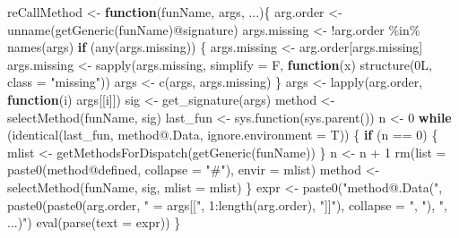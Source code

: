 \documentclass[
]{article}
\newenvironment{Shaded}{\begin{snugshade}}{\end{snugshade}}
\newcommand{\AttributeTok}[1]{\textcolor[rgb]{0.77,0.63,0.00}{#1}}
\newcommand{\ControlFlowTok}[1]{\textcolor[rgb]{0.13,0.29,0.53}{\textbf{#1}}}
\newcommand{\DecValTok}[1]{\textcolor[rgb]{0.00,0.00,0.81}{#1}}
\newcommand{\FunctionTok}[1]{\textcolor[rgb]{0.00,0.00,0.00}{#1}}
\newcommand{\NormalTok}[1]{#1}
\newcommand{\OtherTok}[1]{\textcolor[rgb]{0.56,0.35,0.01}{#1}}
\newcommand{\SpecialCharTok}[1]{\textcolor[rgb]{0.00,0.00,0.00}{#1}}
\newcommand{\StringTok}[1]{\textcolor[rgb]{0.31,0.60,0.02}{#1}}
\begin{document}
\begin{Shaded}
\begin{Highlighting}[]
\NormalTok{reCallMethod }\OtherTok{\textless{}{-}} 
  \ControlFlowTok{function}\NormalTok{(funName, args, ...)\{}
\NormalTok{    arg.order }\OtherTok{\textless{}{-}} \FunctionTok{unname}\NormalTok{(}\FunctionTok{getGeneric}\NormalTok{(funName)}\SpecialCharTok{@}\NormalTok{signature)}
\NormalTok{    args.missing }\OtherTok{\textless{}{-}} \SpecialCharTok{!}\NormalTok{arg.order }\SpecialCharTok{\%in\%} \FunctionTok{names}\NormalTok{(args)}
    \ControlFlowTok{if}\NormalTok{ (}\FunctionTok{any}\NormalTok{(args.missing)) \{}
\NormalTok{      args.missing }\OtherTok{\textless{}{-}}\NormalTok{ arg.order[args.missing]}
\NormalTok{      args.missing }\OtherTok{\textless{}{-}} \FunctionTok{sapply}\NormalTok{(args.missing, }\AttributeTok{simplify =}\NormalTok{ F,}
        \ControlFlowTok{function}\NormalTok{(x) }\FunctionTok{structure}\NormalTok{(0L, }\AttributeTok{class =} \StringTok{"missing"}\NormalTok{))}
\NormalTok{      args }\OtherTok{\textless{}{-}} \FunctionTok{c}\NormalTok{(args, args.missing)}
\NormalTok{    \}}
\NormalTok{    args }\OtherTok{\textless{}{-}} \FunctionTok{lapply}\NormalTok{(arg.order, }\ControlFlowTok{function}\NormalTok{(i) args[[i]])}
\NormalTok{    sig }\OtherTok{\textless{}{-}} \FunctionTok{get\_signature}\NormalTok{(args)}
\NormalTok{    method }\OtherTok{\textless{}{-}} \FunctionTok{selectMethod}\NormalTok{(funName, sig)}
\NormalTok{    last\_fun }\OtherTok{\textless{}{-}} \FunctionTok{sys.function}\NormalTok{(}\FunctionTok{sys.parent}\NormalTok{())}
\NormalTok{    n }\OtherTok{\textless{}{-}} \DecValTok{0}
    \ControlFlowTok{while}\NormalTok{ (}\FunctionTok{identical}\NormalTok{(last\_fun, method}\SpecialCharTok{@}\NormalTok{.Data, }\AttributeTok{ignore.environment =}\NormalTok{ T)) \{}
      \ControlFlowTok{if}\NormalTok{ (n }\SpecialCharTok{==} \DecValTok{0}\NormalTok{) \{}
\NormalTok{        mlist }\OtherTok{\textless{}{-}} \FunctionTok{getMethodsForDispatch}\NormalTok{(}\FunctionTok{getGeneric}\NormalTok{(funName))}
\NormalTok{      \}}
\NormalTok{      n }\OtherTok{\textless{}{-}}\NormalTok{ n }\SpecialCharTok{+} \DecValTok{1}
      \FunctionTok{rm}\NormalTok{(}\AttributeTok{list =} \FunctionTok{paste0}\NormalTok{(method}\SpecialCharTok{@}\NormalTok{defined, }\AttributeTok{collapse =} \StringTok{"\#"}\NormalTok{), }\AttributeTok{envir =}\NormalTok{ mlist)}
\NormalTok{      method }\OtherTok{\textless{}{-}} \FunctionTok{selectMethod}\NormalTok{(funName, sig, }\AttributeTok{mlist =}\NormalTok{ mlist)}
\NormalTok{    \}}
\NormalTok{    expr }\OtherTok{\textless{}{-}} \FunctionTok{paste0}\NormalTok{(}\StringTok{"method@.Data("}\NormalTok{,}
      \FunctionTok{paste0}\NormalTok{(}\FunctionTok{paste0}\NormalTok{(arg.order, }\StringTok{" = args[["}\NormalTok{,}
          \DecValTok{1}\SpecialCharTok{:}\FunctionTok{length}\NormalTok{(arg.order), }\StringTok{"]]"}\NormalTok{),}
        \AttributeTok{collapse =} \StringTok{", "}\NormalTok{),}
      \StringTok{", ...)"}\NormalTok{)}
    \FunctionTok{eval}\NormalTok{(}\FunctionTok{parse}\NormalTok{(}\AttributeTok{text =}\NormalTok{ expr))}
\NormalTok{  \}}


\end{Highlighting}
\end{Shaded}
\end{document}
